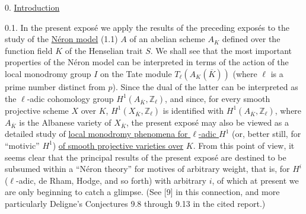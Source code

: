 
0. \underline{Introduction}

0.1. In the present expos\'e we apply the results of the preceding
expos\'es to the study of the \underline{N\'eron model} (1.1) $A$ of an
abelian scheme $A_K$ defined over the function field $K$ of the
Henselian trait $S$. We shall see that the most important properties of
the N\'eron model can be interpreted in terms of the action of the local
monodromy group $I$ on the Tate module
$T_\ell(A_K(\overline K))$ (where $\ell$ is a prime number distinct
from $p$). Since the dual of the latter can be interpreted as the
$\ell$-adic cohomology group $H^1(A_{\overline K},\mathbb Z_\ell)$,
and since, for every smooth projective scheme $X$ over $K$,
$H^1(X_{\overline K},\mathbb Z_\ell)$ is identified with
$H^1(A_{\overline K},\mathbb Z_\ell)$, where $A_{\overline K}$ is the
Albanese variety of $X_{\overline K}$, the present expos\'e may also be
viewed as a detailed study of \underline{local monodromy phenomena for
$\ell$-adic $H^1$} (or, better still, for ``motivic'' $H^1$)
\underline{of smooth projective varieties over} $K$. From this point of
view, it seems clear that the principal results of the present expos\'e
are destined to be subsumed within a ``N\'eron theory'' for motives of
arbitrary weight, that is, for $H^i$ ($\ell$-adic, de Rham, Hodge, and
so forth) with arbitrary $i$, of which at present we are only beginning
to catch a glimpse. (See [9] in this connection, and more particularly
Deligne's Conjectures 9.8 through 9.13 in the cited report.)

